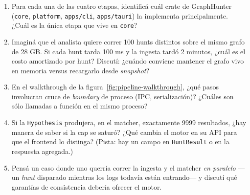 \begin{ejercicios}
\begin{enumerate}
    \item \starred{} Para cada una de las cuatro etapas, identificá
    cuál crate de GraphHunter (\texttt{core}, \texttt{platform},
    \texttt{apps/cli}, \texttt{apps/tauri}) la implementa
    principalmente. ¿Cuál es la única etapa que vive en \texttt{core}?

    \item Imaginá que el analista quiere correr 100 hunts distintos
    sobre el mismo grafo de 28 GB. Si cada hunt tarda 100 ms y la
    ingesta tardó 2 minutos, ¿cuál es el costo amortizado por hunt?
    Discutí: ¿cuándo conviene mantener el grafo vivo en memoria
    versus recargarlo desde \emph{snapshot}?

    \item En el walkthrough de la figura~\ref{fig:pipeline-walkthrough},
    ¿qué pasos involucran cruce de \emph{boundary} de proceso (IPC,
    serialización)? ¿Cuáles son sólo llamadas a función en el mismo
    proceso?

    \item \starred{} Si la \texttt{Hypothesis} produjera, en el
    matcher, exactamente 9999 resultados, ¿hay manera de saber si la
    cap se saturó? ¿Qué cambia el motor en su API para que el
    frontend lo distinga? (Pista: hay un campo en \texttt{HuntResult}
    o en la respuesta agregada.)

    \item Pensá un caso donde uno querría correr la ingesta y el
    matcher \emph{en paralelo} ---un \emph{hunt} disparado mientras
    los logs todavía están entrando--- y discutí qué garantías de
    consistencia debería ofrecer el motor.
\end{enumerate}
\end{ejercicios}
